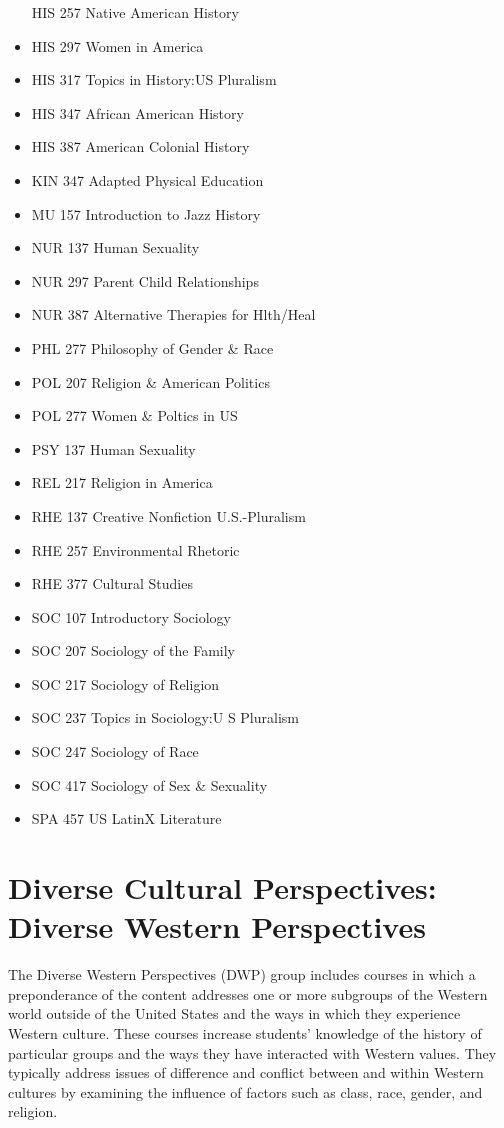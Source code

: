 \documentclass[
  letterpaper,
]{scrbook}
\begin{document}
\begin{itemize}
  HIS 257 Native American History
\item
  HIS 297 Women in America
\item
  HIS 317 Topics in History:US Pluralism
\item
  HIS 347 African American History
\item
  HIS 387 American Colonial History
\item
  KIN 347 Adapted Physical Education
\item
  MU 157 Introduction to Jazz History
\item
  NUR 137 Human Sexuality
\item
  NUR 297 Parent Child Relationships
\item
  NUR 387 Alternative Therapies for Hlth/Heal
\item
  PHL 277 Philosophy of Gender \& Race
\item
  POL 207 Religion \& American Politics
\item
  POL 277 Women \& Poltics in US
\item
  PSY 137 Human Sexuality
\item
  REL 217 Religion in America
\item
  RHE 137 Creative Nonfiction U.S.-Pluralism
\item
  RHE 257 Environmental Rhetoric
\item
  RHE 377 Cultural Studies
\item
  SOC 107 Introductory Sociology
\item
  SOC 207 Sociology of the Family
\item
  SOC 217 Sociology of Religion
\item
  SOC 237 Topics in Sociology:U S Pluralism
\item
  SOC 247 Sociology of Race
\item
  SOC 417 Sociology of Sex \& Sexuality
\item
  SPA 457 US LatinX Literature
\end{itemize}

\section{Diverse Cultural Perspectives: Diverse Western
Perspectives}\label{sec-diverse-cultural-perspectives-western}

The Diverse Western Perspectives (DWP) group includes courses in which a
preponderance of the content addresses one or more subgroups of the
Western world outside of the United States and the ways in which they
experience Western culture. These courses increase students' knowledge
of the history of particular groups and the ways they have interacted
with Western values. They typically address issues of difference and
conflict between and within Western cultures by examining the influence
of factors such as class, race, gender, and religion.
\end{document}
